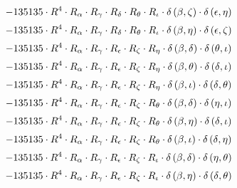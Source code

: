 \begin{subequations}
\begin{gather}
 \\[0.2em] \notag 		 - 135135 \cdot R^{4} \cdot R_{\alpha{}} \cdot R_{\gamma{}} \cdot R_{\delta{}} \cdot R_{\theta{}} \cdot R_{\iota{}} \cdot \delta{}\left(\beta{}, \zeta{}\right) \cdot \delta{}\left(\epsilon{}, \eta{}\right) 
 \\[0.2em] \notag 		 - 135135 \cdot R^{4} \cdot R_{\alpha{}} \cdot R_{\gamma{}} \cdot R_{\delta{}} \cdot R_{\theta{}} \cdot R_{\iota{}} \cdot \delta{}\left(\beta{}, \eta{}\right) \cdot \delta{}\left(\epsilon{}, \zeta{}\right) 
 \\[0.2em] \notag 		 - 135135 \cdot R^{4} \cdot R_{\alpha{}} \cdot R_{\gamma{}} \cdot R_{\epsilon{}} \cdot R_{\zeta{}} \cdot R_{\eta{}} \cdot \delta{}\left(\beta{}, \delta{}\right) \cdot \delta{}\left(\theta{}, \iota{}\right) 
 \\[0.2em] \notag 		 - 135135 \cdot R^{4} \cdot R_{\alpha{}} \cdot R_{\gamma{}} \cdot R_{\epsilon{}} \cdot R_{\zeta{}} \cdot R_{\eta{}} \cdot \delta{}\left(\beta{}, \theta{}\right) \cdot \delta{}\left(\delta{}, \iota{}\right) 
 \\[0.2em] \notag 		 - 135135 \cdot R^{4} \cdot R_{\alpha{}} \cdot R_{\gamma{}} \cdot R_{\epsilon{}} \cdot R_{\zeta{}} \cdot R_{\eta{}} \cdot \delta{}\left(\beta{}, \iota{}\right) \cdot \delta{}\left(\delta{}, \theta{}\right) 
 \\[0.2em] \notag 		 - 135135 \cdot R^{4} \cdot R_{\alpha{}} \cdot R_{\gamma{}} \cdot R_{\epsilon{}} \cdot R_{\zeta{}} \cdot R_{\theta{}} \cdot \delta{}\left(\beta{}, \delta{}\right) \cdot \delta{}\left(\eta{}, \iota{}\right) 
 \\[0.2em] \notag 		 - 135135 \cdot R^{4} \cdot R_{\alpha{}} \cdot R_{\gamma{}} \cdot R_{\epsilon{}} \cdot R_{\zeta{}} \cdot R_{\theta{}} \cdot \delta{}\left(\beta{}, \eta{}\right) \cdot \delta{}\left(\delta{}, \iota{}\right) 
 \\[0.2em] \notag 		 - 135135 \cdot R^{4} \cdot R_{\alpha{}} \cdot R_{\gamma{}} \cdot R_{\epsilon{}} \cdot R_{\zeta{}} \cdot R_{\theta{}} \cdot \delta{}\left(\beta{}, \iota{}\right) \cdot \delta{}\left(\delta{}, \eta{}\right) 
 \\[0.2em] \notag 		 - 135135 \cdot R^{4} \cdot R_{\alpha{}} \cdot R_{\gamma{}} \cdot R_{\epsilon{}} \cdot R_{\zeta{}} \cdot R_{\iota{}} \cdot \delta{}\left(\beta{}, \delta{}\right) \cdot \delta{}\left(\eta{}, \theta{}\right) 
 \\[0.2em] \notag 		 - 135135 \cdot R^{4} \cdot R_{\alpha{}} \cdot R_{\gamma{}} \cdot R_{\epsilon{}} \cdot R_{\zeta{}} \cdot R_{\iota{}} \cdot \delta{}\left(\beta{}, \eta{}\right) \cdot \delta{}\left(\delta{}, \theta{}\right) 

\end{gather}
\end{subequations}
